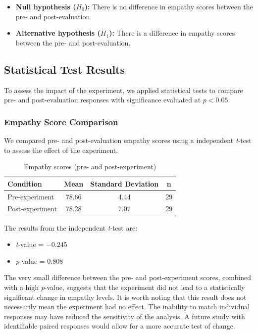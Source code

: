 \begin{itemize}
  \item \textbf{Null hypothesis ($H_0$):} There is no difference in empathy scores between the pre- and post-evaluation.
  \item \textbf{Alternative hypothesis ($H_1$):} There is a difference in empathy scores between the pre- and post-evaluation.
\end{itemize}


\subsection{Statistical Test Results}

To assess the impact of the experiment, we applied statistical tests to compare pre- and post-evaluation responses with significance evaluated at $p < 0.05$.

\subsubsection{Empathy Score Comparison}

We compared pre- and post-evaluation empathy scores using a independent \textit{t}-test to assess the effect of the experiment.

\begin{table}[htbp]
    \centering
    \caption{Empathy scores (pre- and post-experiment)}
    \begin{tabular}{|l|c|c|c|}
        \hline
        \textbf{Condition} & \textbf{Mean} & \textbf{Standard Deviation} & \textbf{n} \\
        \hline
        Pre-experiment & 78.66 & 4.44 & 29 \\
        \hline
        Post-experiment & 78.28 & 7.07 & 29 \\
        \hline
    \end{tabular}
    \label{tab:group_empathy_stats}
\end{table}

The results from the independent \textit{t}-test are:

\begin{itemize}
    \item \textit{t}-value = \(-0.245\)
    \item \textit{p}-value = \(0.808\)
\end{itemize}

The very small difference between the pre- and post-experiment scores, combined with a high \textit{p}-value, suggests that the experiment did not lead to a statistically significant change in empathy levels. It is worth noting that this result does not necessarily mean the experiment had no effect. The inability to match individual responses may have reduced the sensitivity of the analysis. A future study with identifiable paired responses would allow for a more accurate test of change.

